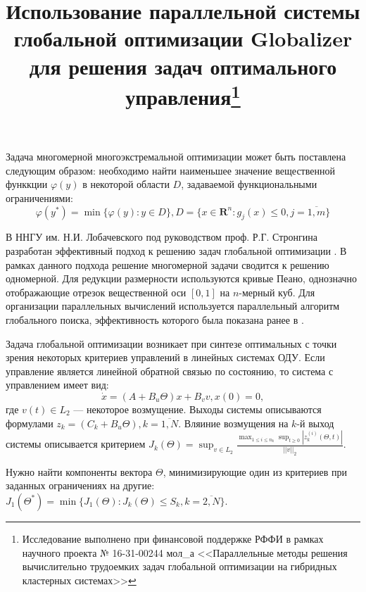 \documentclass[11pt, oneside, a4paper]{article}
\begin{document}

\title{Использование параллельной системы глобальной оптимизации Globalizer для
решения задач оптимального управления\footnote{Исследование выполнено при финансовой
поддержке РФФИ в рамках научного проекта № 16-31-00244 мол\_а <<Параллельные методы
решения вычислительно трудоемких задач глобальной оптимизации на гибридных кластерных системах>>}}

\setlength{\abovedisplayskip}{3pt}
\setlength{\belowdisplayskip}{3pt}

Задача многомерной многоэкстремальной оптимизации может быть поставлена следующим образом:
необходимо найти наименьшее значение вещественной функкции \(\varphi(y)\) в некоторой области \(D\),
задаваемой функциональными ограничениями:
\begin{displaymath}
  \label{task}
    \varphi(y^*)=\min\{\varphi(y):y\in D\}, D=\{x\in \mathbf{R}^n: g_j(x) \leqslant 0, j=\overline{1,m}\}
\end{displaymath}

В ННГУ им. Н.И. Лобачевского под руководством проф. Р.Г. Стронгина разработан
эффективный подход к решению задач глобальной оптимизации \cite{strGergrParOptBook}.
В рамках данного подхода решение многомерной задачи сводится к решению одномерной.
Для редукции размерности используются кривые Пеано, однозначно отображающие отрезок
вещественной оси \([0,1]\) на \(n\)-мерный куб. Для организации параллельных вычислений
используется параллельный алгоритм глобального поиска, эффективность которого была
показана ранее в \cite{parallelMethod}.

Задача глобальной оптимизации возникает при синтезе оптимальных с точки зрения некоторых
критериев управлений в линейных системах ОДУ. Если управление является линейной обратной
связью по состоянию, то система с управлением имеет вид:
\begin{displaymath}
    \dot x = (A+B_u\Theta)x + B_v v, x(0)=0,
\end{displaymath}
где  \(v(t)\in L_2\) --- некоторое возмущение.
Выходы системы описываются формулами \(z_k=(C_k+B_u\Theta),k=\overline{1,N}\).
Вляиние возмущения на \(k\)-й выход системы описывается критерием
\(J_k(\Theta)=\sup_{v\in L_2} \frac{\max_{1\leqslant i \leqslant n_k} \sup_{t\geqslant 0}|z_k^{(i)}(\Theta,t)|}{||v||_2}\).

Нужно найти компоненты вектора \(\Theta\), минимизирующие один из критериев при
заданных ограничениях на другие: \(J_1(\Theta^*)=\min\{J_1(\Theta):J_k(\Theta)\leqslant S_k,k=\overline{2,N}\}\).
\end{document}
